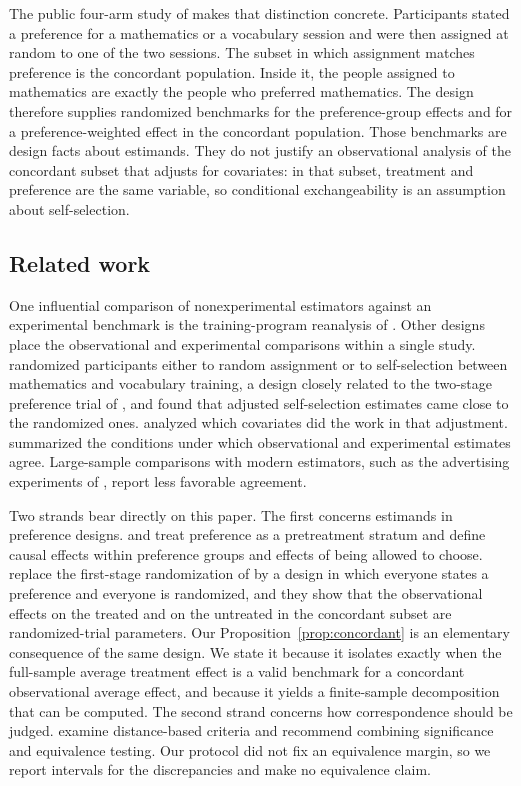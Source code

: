 \documentclass[twoside,11pt]{article}
\begin{document}
The public four-arm study of \citet{keller2025} makes that distinction concrete. Participants stated a preference for a mathematics or a vocabulary session and were then assigned at random to one of the two sessions. The subset in which assignment matches preference is the concordant population. Inside it, the people assigned to mathematics are exactly the people who preferred mathematics. The design therefore supplies randomized benchmarks for the preference-group effects and for a preference-weighted effect in the concordant population. Those benchmarks are design facts about estimands. They do not justify an observational analysis of the concordant subset that adjusts for covariates: in that subset, treatment and preference are the same variable, so conditional exchangeability is an assumption about self-selection.

\subsection{Related work}

One influential comparison of nonexperimental estimators against an experimental benchmark is the training-program reanalysis of \citet{dehejia1999}. Other designs place the observational and experimental comparisons within a single study. \citet{shadish2008} randomized participants either to random assignment or to self-selection between mathematics and vocabulary training, a design closely related to the two-stage preference trial of \citet{rucker1989}, and found that adjusted self-selection estimates came close to the randomized ones. \citet{steiner2010} analyzed which covariates did the work in that adjustment. \citet{cook2008} summarized the conditions under which observational and experimental estimates agree. Large-sample comparisons with modern estimators, such as the advertising experiments of \citet{gordon2019}, report less favorable agreement.

Two strands bear directly on this paper. The first concerns estimands in preference designs. \citet{long2008} and \citet{marcus2012} treat preference as a pretreatment stratum and define causal effects within preference groups and effects of being allowed to choose. \citet{keller2025} replace the first-stage randomization of \citet{shadish2008} by a design in which everyone states a preference and everyone is randomized, and they show that the observational effects on the treated and on the untreated in the concordant subset are randomized-trial parameters. Our Proposition~\ref{prop:concordant} is an elementary consequence of the same design. We state it because it isolates exactly when the full-sample average treatment effect is a valid benchmark for a concordant observational average effect, and because it yields a finite-sample decomposition that can be computed. The second strand concerns how correspondence should be judged. \citet{steinerwong2018} examine distance-based criteria and recommend combining significance and equivalence testing. Our protocol did not fix an equivalence margin, so we report intervals for the discrepancies and make no equivalence claim.
\end{document}
